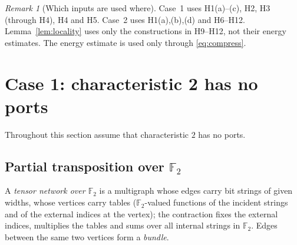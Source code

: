 \documentclass[11pt]{article}
\theoremstyle{definition}
\theoremstyle{remark}
\newtheorem{remark}[theorem]{Remark}
\newcommand{\F}{\mathbb F}
\begin{document}
\begin{remark}[Which inputs are used where]
Case~1 uses H1(a)--(c), H2, H3 (through H4), H4 and H5. Case~2 uses H1(a),(b),(d) and H6--H12. Lemma~\ref{lem:locality} uses
only the constructions in H9--H12, not their energy estimates. The energy estimate is used only through \eqref{eq:compress}.
\end{remark}

\section{Case 1: characteristic 2 has no ports}\label{sec:case1}

Throughout this section assume that characteristic $2$ has no ports.

\subsection{Partial transposition over $\F_2$}
A \emph{tensor network over $\F_2$} is a multigraph whose edges carry bit strings of given widths, whose vertices carry tables
($\F_2$-valued functions of the incident strings and of the external indices at the vertex); the contraction fixes the external
indices, multiplies the tables and sums over all internal strings in $\F_2$. Edges between the same two vertices form a
\emph{bundle}.
\end{document}
